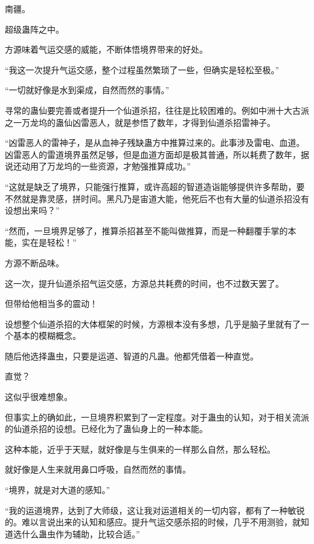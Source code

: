 
\begin{this_body}



南疆。

超级蛊阵之中。

方源味着气运交感的威能，不断体悟境界带来的好处。

“我这一次提升气运交感，整个过程虽然繁琐了一些，但确实是轻松至极。”

“一切就好像是水到渠成，自然而然的事情。”

寻常的蛊仙要完善或者提升一个仙道杀招，往往是比较困难的。例如中洲十大古派之一万龙坞的蛊仙凶雷恶人，就是参悟了数年，才得到仙道杀招雷神子。

“凶雷恶人的雷神子，是从血神子残缺蛊方中推算过来的。此事涉及雷电、血道。凶雷恶人的雷道境界虽然足够，但是血道方面却是极其普通，所以耗费了数年，据说还动用了万龙坞的一些资源，才勉强推算成功。”

“这就是缺乏了境界，只能强行推算，或许高超的智道造诣能够提供许多帮助，要不然就是靠灵感，拼时间。黑凡乃是宙道大能，他死后不也有大量的仙道杀招没有设想出来吗？”

“然而，一旦境界足够了，推算杀招甚至不能叫做推算，而是一种翻覆手掌的本能，实在是轻松！”

方源不断品味。

这一次，提升仙道杀招气运交感，方源总共耗费的时间，也不过数天罢了。

但带给他相当多的震动！

设想整个仙道杀招的大体框架的时候，方源根本没有多想，几乎是脑子里就有了一个基本的模糊概念。

随后他选择蛊虫，只要是运道、智道的凡蛊。他都凭借着一种直觉。

直觉？

这似乎很难想象。

但事实上的确如此，一旦境界积累到了一定程度。对于蛊虫的认知，对于相关流派的仙道杀招的设想。已经化为了蛊仙身上的一种本能。

这种本能，近乎于天赋，就好像是与生俱来的一样那么自然，那么轻松。

就好像是人生来就用鼻口呼吸，自然而然的事情。

“境界，就是对大道的感知。”

“我的运道境界，达到了大师级，这让我对运道相关的一切内容，都有了一种敏锐的。难以言说出来的认知和感应。提升气运交感杀招的时候，几乎不用测验，就知道选什么蛊虫作为辅助，比较合适。”


\end{this_body}
